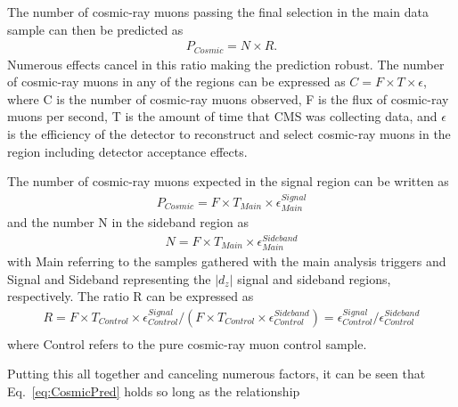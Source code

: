 The number of cosmic-ray muons passing the final selection in the main data sample can then be predicted as 
\begin{equation}
\begin{split}
P_{Cosmic} = N \times R.
\end{split}
\label{eq:CosmicPred}
\end{equation}
Numerous effects cancel in this ratio making the prediction robust. The number of cosmic-ray muons in any of the regions can be expressed as 
$C = F \times T \times \epsilon$, where C is the number of cosmic-ray muons observed, F is the flux of cosmic-ray muons per second, T is the amount of time that CMS was collecting data, and $\epsilon$ is the efficiency of the detector to reconstruct and select cosmic-ray muons in the region including detector acceptance effects. 

The number of cosmic-ray muons expected in the signal region can be written as
\begin{equation}
\begin{split}
P_{Cosmic} = F \times T_{Main} \times \epsilon_{Main}^{Signal}
\end{split}
\label{eq:CosmicSignal}
\end{equation}
and the number N in the sideband region as 
\begin{equation}
\begin{split}
N = F \times T_{Main} \times \epsilon_{Main}^{Sideband}
\end{split}
\label{eq:CosmicSide}
\end{equation}
with Main referring to the samples gathered with the main analysis triggers
and Signal and Sideband representing the $|d_z|$ signal and sideband regions, respectively.
The ratio R can be expressed as
\begin{equation}
\begin{split}
R = F \times T_{Control} \times \epsilon_{Control}^{Signal} / (F \times T_{Control} \times \epsilon_{Control}^{Sideband}) = \epsilon_{Control}^{Signal} / \epsilon_{Control}^{Sideband}\\
\end{split}
\label{eq:CosmicRatio}
\end{equation}
where Control refers to the pure cosmic-ray muon control sample.

Putting this all together and canceling numerous factors, it can be seen that Eq.~\ref{eq:CosmicPred} holds so long as the relationship


